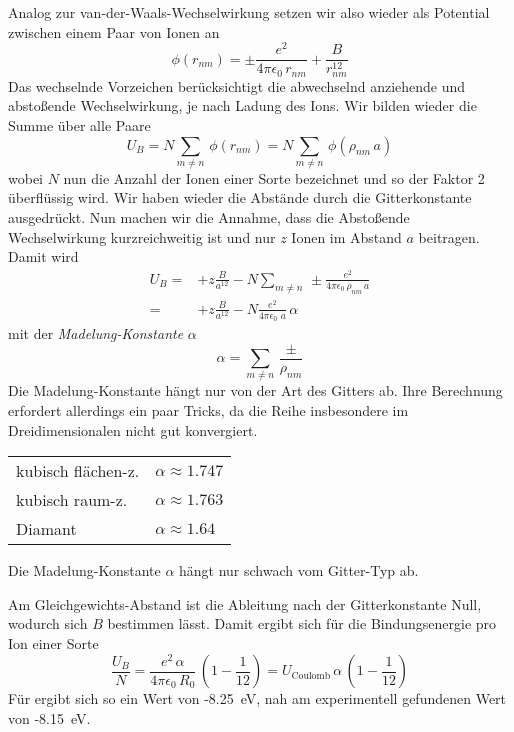 Analog zur van-der-Waals-Wechselwirkung setzen wir also wieder als Potential zwischen einem Paar von Ionen an
\begin{equation}
 \phi(r_{nm}) = \pm \frac{e^2}{4 \pi \epsilon_0 \, r_{nm}} + \frac{B}{ r_{nm}^{12}}
\end{equation}
Das wechselnde Vorzeichen berücksichtigt die abwechselnd anziehende und abstoßende Wechselwirkung, je nach Ladung des Ions. Wir bilden wieder die Summe über alle Paare
\begin{equation}
U_B = N \sum_{m \neq n} \, \phi(r_{nm})  = N \sum_{m \neq n} \, \phi(\rho_{nm} \, a) 
\end{equation}
wobei $N$ nun die Anzahl der Ionen einer Sorte bezeichnet und so der Faktor 2 überflüssig wird. Wir haben wieder die Abstände durch die Gitterkonstante ausgedrückt. Nun machen wir die Annahme, dass die Abstoßende Wechselwirkung kurzreichweitig ist und nur $z$ Ionen im Abstand $a$ beitragen. Damit wird  
\begin{align}
U_B = & + z \frac{ B}{ a^{12}} - N \sum_{m \neq n} \, \pm \frac{e^2}{4 \pi \epsilon_0 \, \rho_{nm} \, a}  \\
= & + z \frac{ B}{ a^{12}} - N \frac{e^2}{4 \pi \epsilon_0 \,  \, a}  \, \alpha
\end{align}
mit der \emph{Madelung-Konstante} $\alpha$
\begin{equation}
 \alpha = \sum_{m \neq n} \, \frac{\pm}{\rho_{nm} }  
\end{equation}
Die Madelung-Konstante hängt nur von der Art des Gitters ab. Ihre Berechnung erfordert allerdings ein paar Tricks, da die Reihe insbesondere im Dreidimensionalen nicht gut konvergiert. 

\begin{marginfigure}

\begin{tabular}{ll}
kubisch flächen-z. & $\alpha \approx 1.747$ \\
kubisch raum-z. & $\alpha \approx 1.763$ \\
Diamant & $\alpha \approx 1.64$ \\
\end{tabular}
\caption{Die Madelung-Konstante $\alpha$ hängt nur schwach vom Gitter-Typ ab.}
\end{marginfigure}

Am Gleichgewichts-Abstand ist die Ableitung nach der Gitterkonstante Null, wodurch sich $B$ bestimmen lässt. Damit ergibt sich für die Bindungsenergie pro Ion einer Sorte
\begin{equation}
\frac{U_B}{N} = \frac{e^2 \, \alpha }{4 \pi \epsilon_0 \, R_0} \, \left( 1- \frac{1}{12} \right) = U_\text{Coulomb} \, \alpha \, \left( 1- \frac{1}{12} \right) 
\end{equation}
Für  ergibt sich so ein Wert von -8.25~eV, nah am experimentell gefundenen Wert von -8.15~eV.





